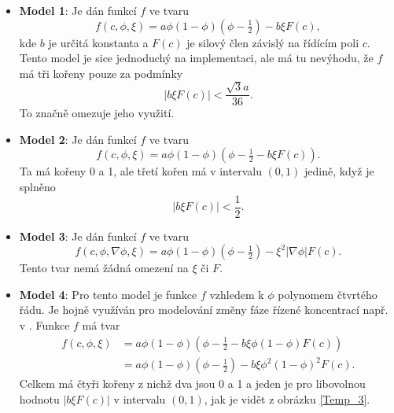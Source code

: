 \begin{itemize}
    \item \textbf{Model 1}: Je dán funkcí \(f\) ve tvaru
    \begin{equation}
        f(c, \phi, \xi) = a\phi(1-\phi)(\phi-\tfrac{1}{2}) - b\xi F(c),
    \end{equation}
    kde \(b\) je určitá konstanta a \(F(c)\) je silový člen závislý na řídícím poli \(c\).
    Tento model je sice jednoduchý na implementaci, ale má tu nevýhodu, že \(f\) má tři kořeny pouze za podmínky
    \begin{equation}
        \big\vert b \xi F(c) \big\vert < \frac{\sqrt{3}a}{36}.
    \end{equation}
    To značně omezuje jeho využití.

    \item \textbf{Model 2}: Je dán funkcí \(f\) ve tvaru
    \begin{equation}
        f(c, \phi, \xi) = a\phi(1-\phi)\left(\phi-\tfrac{1}{2} - b \xi F(c)\right).
    \end{equation}
    Ta má kořeny 0 a 1, ale třetí kořen má v intervalu \((0,1)\) jedině, když je splněno
    \begin{equation}
        \big\vert b \xi F(c) \big\vert < \frac{1}{2}.
    \end{equation}

    \item \textbf{Model 3}: Je dán funkcí \(f\) ve tvaru
    \begin{equation}
        f(c, \phi, \nabla \phi, \xi) = a\phi\left(1-\phi\right)\left(\phi-\tfrac{1}{2}\right) - \xi^2\vert\nabla \phi \vert F(c).
    \end{equation}
    Tento tvar nemá žádná omezení na \(\xi\) či \(F\).

    \item \textbf{Model 4}: Pro tento model je funkce \(f\) vzhledem k \(\phi\) polynomem čtvrtého řádu. Je hojně využíván pro modelování změny fáze řízené koncentrací např. v \cite{Loginova_2004,Boettinger_2002, Choudhuri_2013}.
    Funkce \(f\) má tvar
    \begin{equation}\label{f modelu 4}
        \begin{aligned}
        f(c, \phi, \xi) &= a\phi(1-\phi)\left(\phi-\tfrac{1}{2}-b\xi \phi (1-\phi) F(c) \right)\\
        &=a\phi(1-\phi)\left(\phi-\tfrac{1}{2}\right) - b\xi \phi^2 (1-\phi)^2 F(c).
        \end{aligned}
    \end{equation}
    Celkem má čtyři kořeny z nichž dva jsou 0 a 1 a jeden je pro libovolnou hodnotu \(\vert b \xi F(c) \vert\) v intervalu \((0, 1)\), jak je vidět z obrázku \ref{Temp_3}.
\end{itemize}

